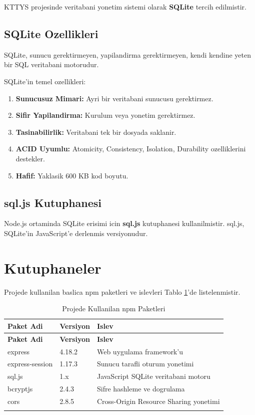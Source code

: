 KTTYS projesinde veritabani yonetim sistemi olarak \textbf{SQLite} 
tercih edilmistir.

\subsection{SQLite Ozellikleri}
\label{subsec:sqlite-ozellikleri}

SQLite, sunucu gerektirmeyen, yapilandirma gerektirmeyen, 
kendi kendine yeten bir SQL veritabani motorudur.

SQLite'in temel ozellikleri:

\begin{enumerate}
    \item \textbf{Sunucusuz Mimari:} Ayri bir veritabani sunucusu 
    gerektirmez.
    \item \textbf{Sifir Yapilandirma:} Kurulum veya yonetim 
    gerektirmez.
    \item \textbf{Tasinabilirlik:} Veritabani tek bir dosyada 
    saklanir.
    \item \textbf{ACID Uyumlu:} Atomicity, Consistency, Isolation, 
    Durability ozelliklerini destekler.
    \item \textbf{Hafif:} Yaklasik 600 KB kod boyutu.
\end{enumerate}

\subsection{sql.js Kutuphanesi}
\label{subsec:sqljs}

Node.js ortaminda SQLite erisimi icin \textbf{sql.js} kutuphanesi 
kullanilmistir. sql.js, SQLite'in JavaScript'e derlenmis 
versiyonudur.

\section{Kutuphaneler}
\label{sec:kutuphaneler}

Projede kullanilan baslica npm paketleri ve islevleri Tablo 
\ref{tab:npm-paketleri}'de listelenmistir.

\begin{longtable}{|p{3cm}|p{2cm}|p{7cm}|}
\hline
\textbf{Paket Adi} & \textbf{Versiyon} & \textbf{Islev} \\
\hline
\endfirsthead
\hline
\textbf{Paket Adi} & \textbf{Versiyon} & \textbf{Islev} \\
\hline
\endhead
\hline
\endfoot

express & 4.18.2 & Web uygulama framework'u \\
\hline
express-session & 1.17.3 & Sunucu tarafli oturum yonetimi \\
\hline
sql.js & 1.x & JavaScript SQLite veritabani motoru \\
\hline
bcryptjs & 2.4.3 & Sifre hashleme ve dogrulama \\
\hline
cors & 2.8.5 & Cross-Origin Resource Sharing yonetimi \\
\hline

\caption{Projede Kullanilan npm Paketleri}
\label{tab:npm-paketleri}
\end{longtable}

